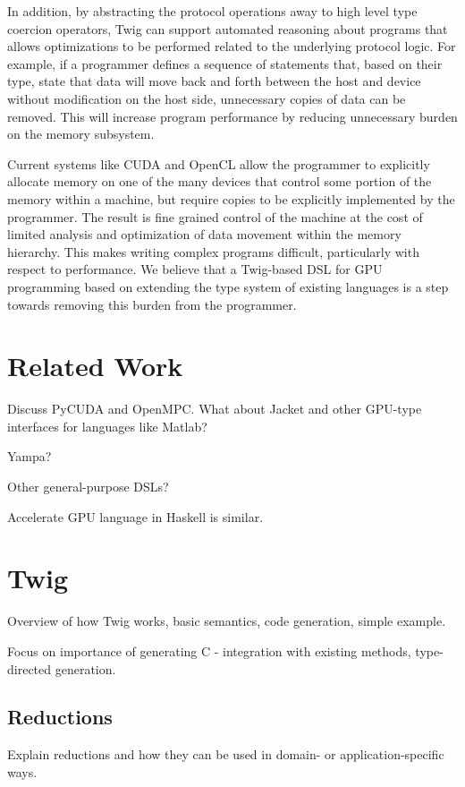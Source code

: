 \documentclass[11pt]{article}
\begin{document}
In addition, by abstracting the protocol operations away to high level
type coercion operators, Twig can support automated reasoning about
programs that allows optimizations to be performed related to the underlying
protocol logic.  For example, if a programmer defines a sequence of
statements that, based on their type, state that data will move back and forth
between the host and device without modification on the host side, unnecessary
copies of data can be removed.  This will increase program performance by
reducing unnecessary burden on the memory subsystem.

Current systems like CUDA and OpenCL allow the programmer to explicitly
allocate memory on one of the many devices that control some portion of 
the memory within a machine, but require copies to be explicitly implemented
by the programmer.  The result is fine grained control of the machine at the
cost of limited analysis and optimization of data movement within the memory
hierarchy.  This makes writing complex programs difficult, particularly with
respect to performance.  We believe that a Twig-based DSL for GPU programming
based on extending the type system of existing languages is a step towards
removing this burden from the programmer.

\section{Related Work}

Discuss PyCUDA and OpenMPC. What about Jacket and other GPU-type interfaces
for languages like Matlab?

Yampa?

Other general-purpose DSLs?

Accelerate GPU language in Haskell is similar.  

\section{Twig}

Overview of how Twig works, basic semantics, code generation, simple example.

Focus on importance of generating C - integration with existing methods, type-directed generation.

\subsection{Reductions}

Explain reductions and how they can be used in domain- or application-specific
ways.
\end{document}
